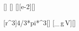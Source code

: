 [\mpss]
[\kgpmk]
[\cm][e-2][\m]

[\pi r^3]{4/3*pi*\rKX^3}[\m\cubed]
[\rho_\,g\,V]{\rhoWX*\gEX*\VKX}[\newton]
